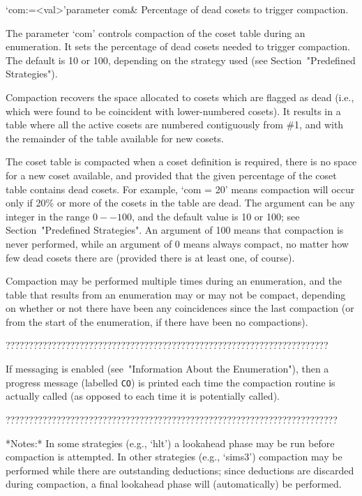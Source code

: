 \>`com:=<val>'{parameter com}&
Percentage of dead cosets to trigger compaction.


The parameter `com'  controls compaction of the coset  table during an
enumeration.  It sets the percentage  of dead cosets needed to trigger
compaction.  The default is 10  or 100, depending on the strategy used
(see Section~"Predefined Strategies").

Compaction recovers the space allocated to cosets which are flagged as
dead  (i.e., which  were found  to be  coincident  with lower-numbered
cosets).   It results  in  a table  where  all the  active cosets  are
numbered contiguously  from \#1, and  with the remainder of  the table
available for new cosets.

The  coset table  is compacted  when a  coset definition  is required,
there is  no space for  a new coset  available, and provided  that the
given  percentage  of  the  coset  table contains  dead  cosets.   For
example, `com =  20' means compaction will occur only  if 20\% or more
of the cosets in the table  are dead.  The argument can be any integer
in  the range  $0--100$,  and the  default  value is  10  or 100;  see
Section~"Predefined  Strategies".   An  argument  of  100  means  that
compaction is  never performed,  while an argument  of 0  means always
compact, no matter how few dead cosets there are (provided there is at
least one, of course).

Compaction may be performed  multiple times during an enumeration, and
the table that results from an  enumeration may or may not be compact,
depending on whether or not there have been any coincidences since the
last compaction (or  from the start of the  enumeration, if there have
been no compactions).

??????????????????????????????????????????????????????????????????????

If messaging is enabled (see~"Information About the Enumeration"), then a
progress message (labelled {\tt CO}) is printed each time the compaction routine
is actually called (as opposed to each time it is potentially called).

????????????????????????????????????????????????????????????????????????


*Notes:*
In some strategies  (e.g., `hlt') a lookahead phase  may be run before
compaction  is   attempted.   In  other   strategies  (e.g.,  `sims3')
compaction may  be performed  while there are  outstanding deductions;
since deductions  are discarded  during compaction, a  final lookahead
phase will (automatically) be performed.

